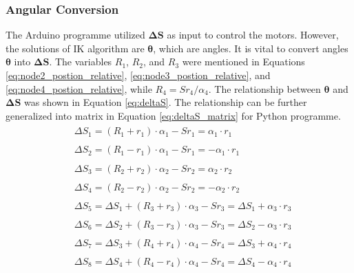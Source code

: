 \subsubsection{Angular Conversion}
The Arduino programme utilized $\boldsymbol{\Delta S}$ as input to control the motors. However, the solutions of IK 
algorithm are $\boldsymbol{\theta}$, which are angles. It is vital to convert angles $\boldsymbol{\theta}$ 
into $\boldsymbol{\Delta S}$. The variables $R_1$, $R_2$, and $R_3$ were mentioned in Equations 
\ref{eq:node2_postion_relative}, \ref{eq:node3_postion_relative}, and \ref{eq:node4_postion_relative}, while 
$R_4 = {Sr}_4/ \alpha_4$. The relationship between $\boldsymbol{\theta}$ and $\boldsymbol{\Delta S}$ was shown in 
Equation \ref{eq:deltaS}. The relationship can be further generalized into matrix in Equation \ref{eq:deltaS_matrix} 
for Python programme.
\vspace{-5mm}
\begin{align}
    &\begin{aligned}
        \Delta S_1=(R_1+r_1)\cdot\alpha_1-Sr_1 = \alpha_1\cdot r_1
    \end{aligned} \nonumber
    \\
    &\begin{aligned}
        \Delta S_2=(R_1-r_1)\cdot\alpha_1-Sr_1 = -\alpha_1\cdot r_1
    \end{aligned} 
    \nonumber \\
    &\begin{aligned} 
        \Delta S_3=(R_2+r_2)\cdot\alpha_2-Sr_2 = \alpha_2\cdot r_2
    \end{aligned} \nonumber
    \\
    &\begin{aligned}
        \Delta S_4=(R_2-r_2)\cdot\alpha_2-Sr_2 = -\alpha_2\cdot r_2
    \end{aligned}
    \nonumber \\
    &\begin{aligned}
        \Delta S_5= \Delta S_1+ (R_3+r_3)\cdot\alpha_3-Sr_3 = \Delta S_1+\alpha_3\cdot r_3
    \end{aligned} \nonumber
    \\
    &\begin{aligned}
        \Delta S_6= \Delta S_2 + (R_3-r_3)\cdot\alpha_3-Sr_3 = \Delta S_2-\alpha_3\cdot r_3
    \end{aligned}
    \nonumber \\
    &\begin{aligned} 
        \Delta S_7=\Delta S_3+(R_4+r_4)\cdot\alpha_4-Sr_4 = \Delta S_3+\alpha_4\cdot r_4
    \end{aligned} \nonumber
    \\
    &\begin{aligned}
        \Delta S_8=\Delta S_4+(R_4-r_4)\cdot\alpha_4-Sr_4 = \Delta S_4-\alpha_4\cdot r_4
    \end{aligned}
    \label{eq:deltaS}
\end{align}
